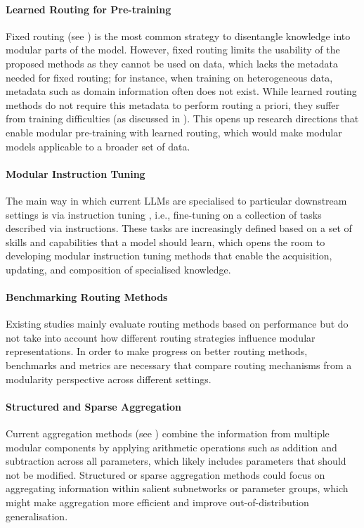 \documentclass[10pt]{article} %
\begin{document}
\paragraph*{Learned Routing for Pre-training} Fixed routing (see ) is the most common strategy to disentangle knowledge into modular parts of the model. However, fixed routing limits the usability of the proposed methods as they cannot be used on data, which lacks the metadata needed for fixed routing; for instance, when training on heterogeneous data, metadata such as domain information often does not exist. While learned routing methods do not require this metadata to perform routing a priori, they suffer from training difficulties (as discussed in ). This opens up research directions that enable modular pre-training with learned routing, which would make modular models applicable to a broader set of data. 

\paragraph{Modular Instruction Tuning} The main way in which current LLMs are specialised to particular downstream settings is via instruction tuning \citep{wei2021finetuned}, i.e., fine-tuning on a collection of tasks described via instructions. These tasks are increasingly defined based on a set of skills and capabilities that a model should learn, which opens the room to developing modular instruction tuning methods that enable the acquisition, updating, and composition of specialised knowledge.

\paragraph*{Benchmarking Routing Methods} Existing studies mainly evaluate routing methods based on performance but do not take into account how different routing strategies influence modular representations. In order to make progress on better routing methods, benchmarks and metrics are necessary that compare routing mechanisms from a modularity perspective across different settings. 

\paragraph*{Structured and Sparse Aggregation} Current aggregation methods (see ) combine the information from multiple modular components by applying arithmetic operations such as addition and subtraction across all parameters, which likely includes parameters that should not be modified. Structured or sparse aggregation methods could focus on aggregating information within salient subnetworks or parameter groups, which might make aggregation more efficient and improve out-of-distribution generalisation.
\end{document}
